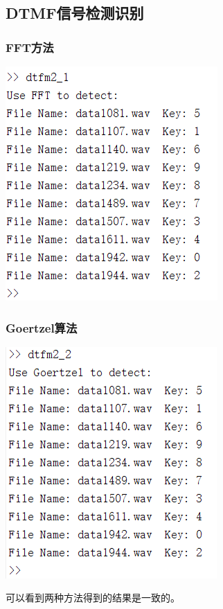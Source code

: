 \documentclass[10pt, a4paper]{article}
\begin{document}
\subsection{DTMF信号检测识别}

\subsubsection{FFT方法}

\centerline{\includegraphics[scale=1.0]{assets/10.png}}

\subsubsection{Goertzel算法}

\centerline{\includegraphics[scale=1.0]{assets/11.png}}

可以看到两种方法得到的结果是一致的。
\end{document}

